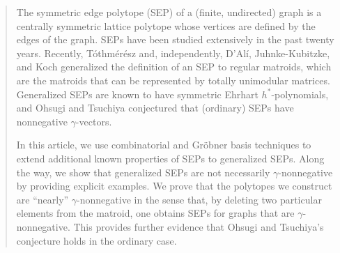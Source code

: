 \documentclass{amsart}
\numberwithin{equation}{section}
\theoremstyle{plain}
\theoremstyle{definition}
\newcommand{\ZZ}{\mathbb{Z}}
\begin{document}




\begin{abstract}
    The symmetric edge polytope (SEP) of a (finite, undirected) graph is a centrally symmetric lattice polytope whose vertices are defined by the edges of the graph.
    SEPs have been studied extensively in the past twenty years.
    Recently, T\'othm\'er\'esz and, independently, D'Al\'i, Juhnke-Kubitzke, and Koch generalized the definition of an SEP to regular matroids, which are the matroids that can be represented by totally unimodular matrices.
    Generalized SEPs are known to have symmetric Ehrhart $h^*$-polynomials, and Ohsugi and Tsuchiya conjectured that (ordinary) SEPs have nonnegative $\gamma$-vectors.    

    In this article, we use combinatorial and Gr\"obner basis techniques to extend additional known properties of SEPs to generalized SEPs.
    Along the way, we show that generalized SEPs are not necessarily $\gamma$-nonnegative by providing explicit examples.
    We prove that the polytopes we construct are ``nearly'' $\gamma$-nonnegative in the sense that, by deleting two particular elements from the matroid, one obtains SEPs for graphs that are $\gamma$-nonnegative.
    This provides further evidence that Ohsugi and Tsuchiya's conjecture holds in the ordinary case.
\end{abstract}
\end{document}

